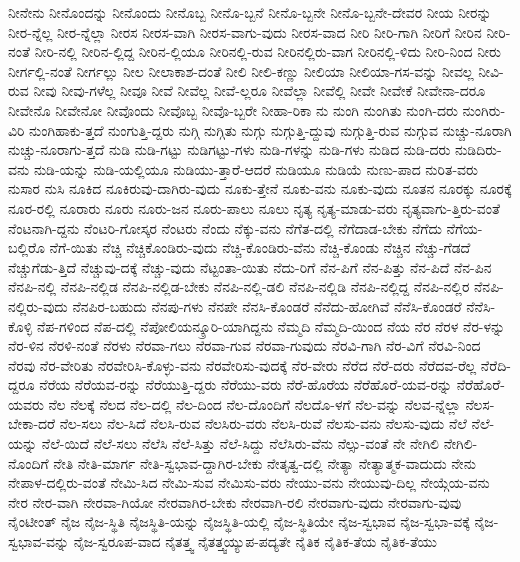 {ನೀನೇನು
ನೀನೊಂದನ್ನು
ನೀನೊಂದು
ನೀನೊಬ್ಬ
ನೀನೊ-ಬ್ಬನೆ
ನೀನೊ-ಬ್ಬನೇ
ನೀನೊ-ಬ್ಬನೇ-ದೇವರ
ನೀಯ
ನೀರನ್ನು
ನೀರ-ನ್ನೆಲ್ಲ
ನೀರ-ನ್ನೆಲ್ಲಾ
ನೀರಸ
ನೀರಸ-ವಾಗಿ
ನೀರಸ-ವಾಗು-ವುದು
ನೀರಸ-ವಾದ
ನೀರಿ
ನೀರಿ-ಗಾಗಿ
ನೀರಿಗೆ
ನೀರಿನ
ನೀರಿ-ನಂತೆ
ನೀರಿ-ನಲ್ಲಿ
ನೀರಿನ-ಲ್ಲಿದ್ದ
ನೀರಿನ-ಲ್ಲಿಯೂ
ನೀರಿನಲ್ಲಿ-ರುವ
ನೀರಿನಲ್ಲಿರು-ವಾಗ
ನೀರಿನಲ್ಲಿ-ಳಿದು
ನೀರಿ-ನಿಂದ
ನೀರು
ನೀರ್ಗಲ್ಲಿ-ನಂತೆ
ನೀರ್ಗಲ್ಲು
ನೀಲ
ನೀಲಾಕಾಶ-ದಂತೆ
ನೀಲಿ
ನೀಲಿ-ಕಣ್ಣು
ನೀಲಿಯಾ
ನೀಲಿಯಾ-ಗಸ-ವನ್ನು
ನೀವಲ್ಲ
ನೀವಿ-ರುವ
ನೀವು
ನೀವು-ಗಳೆಲ್ಲ
ನೀವೂ
ನೀವೆ
ನೀವೆಲ್ಲ
ನೀವೆ-ಲ್ಲರೂ
ನೀವೆಲ್ಲಾ
ನೀವೆಲ್ಲಿ
ನೀವೇ
ನೀವೇಕೆ
ನೀವೇನಾ-ದರೂ
ನೀವೇನೊ
ನೀವೇನೋ
ನೀವೊಂದು
ನೀವೊಬ್ಬ
ನೀವೊ-ಬ್ಬರೇ
ನೀಹಾ-ರಿಕಾ
ನು
ನುಂಗಿ
ನುಂಗಿತು
ನುಂಗಿ-ದರು
ನುಂಗಿರು-ವಿರಿ
ನುಂಗಿಹಾಕು-ತ್ತದೆ
ನುಂಗುತ್ತಿ-ದ್ದರು
ನುಗ್ಗಿ
ನುಗ್ಗಿತು
ನುಗ್ಗು
ನುಗ್ಗುತ್ತಿ-ದ್ದುವು
ನುಗ್ಗುತ್ತಿ-ರುವ
ನುಗ್ಗುವ
ನುಚ್ಚು-ನೂರಾಗಿ
ನುಚ್ಚು-ನೂರಾಗು-ತ್ತದೆ
ನುಡಿ
ನುಡಿ-ಗಟ್ಟು
ನುಡಿಗಟ್ಟು-ಗಳು
ನುಡಿ-ಗಳನ್ನು
ನುಡಿ-ಗಳು
ನುಡಿದ
ನುಡಿ-ದರು
ನುಡಿದಿರು-ವನು
ನುಡಿ-ಯನ್ನು
ನುಡಿ-ಯಲ್ಲಿಯೂ
ನುಡಿಯು-ತ್ತಾರೆ-ಆದರೆ
ನುಡಿಯೂ
ನುಡಿಯೆ
ನುಣು-ಪಾದ
ನುರಿತ-ವರು
ನುಸಾರ
ನುಸಿ
ನೂಕಿದ
ನೂಕಿರುವು-ದಾಗಿರು-ವುದು
ನೂಕು-ತ್ತೇನೆ
ನೂಕು-ವನು
ನೂಕು-ವುದು
ನೂತನ
ನೂರಕ್ಕು
ನೂರಕ್ಕೆ
ನೂರ-ರಲ್ಲಿ
ನೂರಾರು
ನೂರು
ನೂರು-ಜನ
ನೂರು-ಪಾಲು
ನೂಲು
ನೃತ್ಯ
ನೃತ್ಯ-ಮಾಡು-ವರು
ನೃತ್ಯವಾಗು-ತ್ತಿರು-ವಂತೆ
ನೆಂಟನಾಗಿ-ದ್ದನು
ನೆಂಟರಿ-ಗೋಸ್ಕರ
ನೆಂಟರು
ನೆಂದು
ನೆಕ್ಕು-ವನು
ನೆಗೆತ-ದಲ್ಲಿ
ನೆಗೆದಾಡ-ಬೇಕು
ನೆಗೆದು
ನೆಗೆಯ-ಬಲ್ಲಿರೊ
ನೆಗೆ-ಯಿತು
ನೆಚ್ಚಿ
ನೆಚ್ಚಿಕೊಂಡಿರು-ವುದು
ನೆಚ್ಚಿ-ಕೊಂಡಿರು-ವೆನು
ನೆಚ್ಚಿ-ಕೊಂಡು
ನೆಚ್ಚಿನ
ನೆಚ್ಚು-ಗೆಡದೆ
ನೆಚ್ಚುಗೆಡು-ತ್ತಿದೆ
ನೆಚ್ಚುವು-ದಕ್ಕೆ
ನೆಚ್ಚು-ವುದು
ನೆಟ್ಟಂತಾ-ಯಿತು
ನೆದು-ರಿಗೆ
ನೆನ-ಪಿಗೆ
ನೆನ-ಪಿತ್ತು
ನೆನ-ಪಿದೆ
ನೆನ-ಪಿನ
ನೆನಪಿ-ನಲ್ಲಿ
ನೆನಪಿ-ನಲ್ಲಿಡ
ನೆನಪಿ-ನಲ್ಲಿಡ-ಬೇಕು
ನೆನಪಿ-ನಲ್ಲಿ-ಡಲಿ
ನೆನಪಿ-ನಲ್ಲಿಡಿ
ನೆನಪಿ-ನಲ್ಲಿದ್ದ
ನೆನಪಿ-ನಲ್ಲಿರ
ನೆನಪಿ-ನಲ್ಲಿರು-ವುದು
ನೆನಪಿರ-ಬಹುದು
ನೆನಪು-ಗಳು
ನೆನಪೇ
ನೆನಸಿ-ಕೊಂಡರೆ
ನೆನೆದು-ಹೋಗಿವೆ
ನೆನೆಸಿ-ಕೊಂಡರೆ
ನೆನೆಸಿ-ಕೊಳ್ಳಿ
ನೆಪ-ಗಳಿಂದ
ನೆಪ-ದಲ್ಲಿ
ನೆಪೋಲಿಯನ್ಕ್ರೂರಿ-ಯಾಗಿದ್ದನು
ನೆಮ್ಮದಿ
ನೆಮ್ಮದಿ-ಯಿಂದ
ನೆಯ
ನೆರ
ನೆರಳ
ನೆರ-ಳನ್ನು
ನೆರ-ಳಿನ
ನೆರಳಿ-ನಂತೆ
ನೆರಳು
ನೆರವಾ-ಗಲು
ನೆರವಾ-ಗುವ
ನೆರವಾ-ಗುವುದು
ನೆರವಿ-ಗಾಗಿ
ನೆರ-ವಿಗೆ
ನೆರವಿ-ನಿಂದ
ನೆರವು
ನೆರ-ವೇರಿತು
ನೆರವೇರಿಸಿ-ಕೊಳ್ಳು-ವನು
ನೆರವೇರಿಸು-ವುದಕ್ಕೆ
ನೆರ-ವೇರು
ನೆರೆದ
ನೆರೆ-ದರು
ನೆರೆದವ-ರೆಲ್ಲ
ನೆರೆದಿ-ದ್ದರೂ
ನೆರೆಯ
ನೆರೆಯವ-ರನ್ನು
ನೆರೆಯುತ್ತಿ-ದ್ದರು
ನೆರೆಯು-ವರು
ನೆರೆ-ಹೊರೆಯ
ನೆರೆಹೊರೆ-ಯವ-ರನ್ನು
ನೆರೆಹೊರೆ-ಯವರು
ನೆಲ
ನೆಲಕ್ಕೆ
ನೆಲದ
ನೆಲ-ದಲ್ಲಿ
ನೆಲ-ದಿಂದ
ನೆಲ-ದೊಂದಿಗೆ
ನೆಲದೊ-ಳಗೆ
ನೆಲ-ವನ್ನು
ನೆಲವ-ನ್ನೆಲ್ಲಾ
ನೆಲಸ-ಬೇಕಾ-ದರೆ
ನೆಲ-ಸಲು
ನೆಲ-ಸಿದೆ
ನೆಲಸಿ-ರುವ
ನೆಲಸಿರು-ವರು
ನೆಲಸಿ-ರುವೆ
ನೆಲಸು-ವನು
ನೆಲಸು-ವುದು
ನೆಲೆ
ನೆಲೆ-ಯನ್ನು
ನೆಲೆ-ಯಿದೆ
ನೆಲೆ-ಸಲು
ನೆಲೆಸಿ
ನೆಲೆ-ಸಿತ್ತು
ನೆಲೆ-ಸಿದ್ದು
ನೆಲೆಸಿರು-ವೆನು
ನೆಲ್ಸು-ವಂತೆ
ನೇ
ನೇಗಿಲಿ
ನೇಗಿಲಿ-ನೊಂದಿಗೆ
ನೇತಿ
ನೇತಿ-ಮಾರ್ಗ
ನೇತಿ-ಸ್ವಭಾವ-ದ್ದಾಗಿರ-ಬೇಕು
ನೇತೃತ್ವ-ದಲ್ಲಿ
ನೇತ್ಯಾ
ನೇತ್ಯಾತ್ಮಕ-ವಾದುದು
ನೇನು
ನೇಪಾಳ-ದಲ್ಲಿರು-ವಂತೆ
ನೇಮಿ-ಸಿದ
ನೇಮಿ-ಸುವ
ನೇಮಿಸು-ವರು
ನೇಯು-ವನು
ನೇಯುವು-ದಿಲ್ಲ
ನೇಯ್ಗೆಯ-ವನು
ನೇರ
ನೇರ-ವಾಗಿ
ನೇರವಾ-ಗಿಯೋ
ನೇರವಾಗಿರ-ಬೇಕು
ನೇರವಾಗಿ-ರಲಿ
ನೇರವಾಗು-ವುದು
ನೇರವಾಗು-ವುವು
ನೈಂಟೀಂತ್
ನೈಜ
ನೈಜ-ಸ್ಥಿತಿ
ನೈಜಸ್ಥಿತಿ-ಯನ್ನು
ನೈಜಸ್ಥಿತಿ-ಯಲ್ಲಿ
ನೈಜ-ಸ್ಥಿತಿಯೇ
ನೈಜ-ಸ್ವಭಾವ
ನೈಜ-ಸ್ವಭಾ-ವಕ್ಕೆ
ನೈಜ-ಸ್ವಭಾವ-ವನ್ನು
ನೈಜ-ಸ್ವರೂಪ-ವಾದ
ನೈತತ್ತ್ವ
ನೈತತ್ತ್ವಯ್ಯುಪ-ಪದ್ಯತೇ
ನೈತಿಕ
ನೈತಿಕ-ತೆಯ
ನೈತಿಕ-ತೆಯು
}

